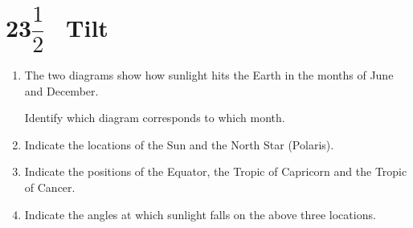 \section{23$\dfrac{1}{2}$\degree~ Tilt}
\sunTilt
\begin{enumerate}[\style (1)] \resume

	\item The two diagrams show how sunlight hits the Earth in the months of June and December.

	Identify which diagram corresponds to which month.

	\item Indicate the locations of the Sun and the North Star (Polaris).

	\item Indicate the positions of the Equator, the Tropic of Capricorn and the Tropic of Cancer.

	\item Indicate the angles at which sunlight falls on the above three locations.

\end{enumerate}



